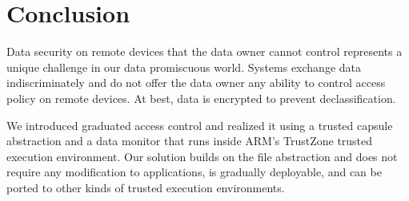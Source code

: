 \chapter{Conclusion}
\label{sec:conc}

Data security on remote devices that the data owner cannot control
represents a unique challenge in our data promiscuous world.  Systems
exchange data indiscriminately and do not offer the data owner any
ability to control access policy on remote devices. At best, data is
encrypted to prevent declassification. %

We introduced graduated access control and realized it using a trusted
capsule abstraction and a data monitor that runs inside ARM's
TrustZone trusted execution environment. Our solution builds on the
file abstraction and does not require any modification to
applications, is gradually deployable, and can be ported to other
kinds of trusted execution environments.





